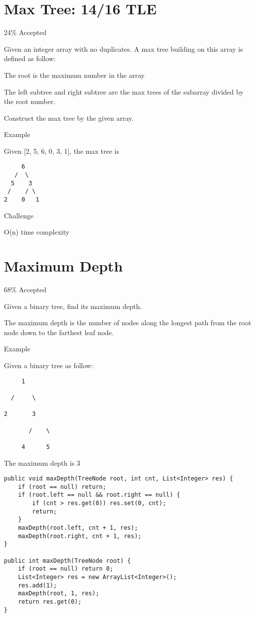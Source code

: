 \documentclass[12pt]{book}
\begin{document}
\chapter{Max Tree: 14/16 TLE}
\label{sec-35}

24\% Accepted

Given an integer array with no duplicates. A max tree building on this array is defined as follow:

The root is the maximum number in the array

The left subtree and right subtree are the max trees of the subarray divided by the root number.

Construct the max tree by the given array.

Example

Given [2, 5, 6, 0, 3, 1], the max tree is
\lstset{language=java,label= ,caption= ,numbers=none}
\begin{lstlisting}
     6
   /  \
  5    3
 /    / \
2    0   1
\end{lstlisting}
Challenge

O(n) time complexity
\chapter{Maximum Depth}
\label{sec-36}

68\% Accepted

Given a binary tree, find its maximum depth.

The maximum depth is the number of nodes along the longest path from the root node down to the farthest leaf node.

Example

Given a binary tree as follow:
\lstset{language=java,label= ,caption= ,numbers=none}
\begin{lstlisting}
     1

  /     \ 

2       3

       /    \

     4      5
\end{lstlisting}

The maximum depth is 3
\lstset{language=java,label= ,caption= ,numbers=none}
\begin{lstlisting}
public void maxDepth(TreeNode root, int cnt, List<Integer> res) {
    if (root == null) return;
    if (root.left == null && root.right == null) {
        if (cnt > res.get(0)) res.set(0, cnt);
        return;
    }
    maxDepth(root.left, cnt + 1, res);
    maxDepth(root.right, cnt + 1, res);
}

public int maxDepth(TreeNode root) {
    if (root == null) return 0;
    List<Integer> res = new ArrayList<Integer>();
    res.add(1);
    maxDepth(root, 1, res);
    return res.get(0);
}
\end{lstlisting}
\end{document}
